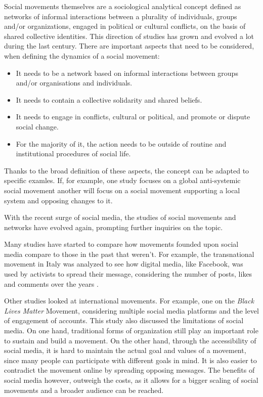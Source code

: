\documentclass{article}
\begin{document}
    Social movements themselves are a sociological analytical concept defined as networks of informal interactions between a plurality of individuals, groups and/or organizations, engaged in political or cultural conflicts, on the basis of shared collective identities. This direction of studies has grown and evolved a lot during the last century. There are important aspects that need to be considered, when defining the dynamics of a social movement: 
    \begin{itemize}
    \item It needs to be a network based on informal interactions between groups and/or organisations and individuals.
    \item It needs to contain a collective solidarity and shared beliefs.
    \item It needs to engage in conflicts, cultural or political, and promote or dispute social change.
    \item  For the majority of it, the action needs to be outside of routine and institutional procedures of social life.
    \end{itemize}
    Thanks to the broad definition of these aspects, the concept can be adapted to specific examles. If, for example, one study focuses on a global anti-systemic social movement another will focus on a social movement supporting a local system and opposing changes to it\cite{diani_concept_1992}.
    
    With the recent surge of social media, the studies of social movements and networks have evolved again, prompting further inquiries on the topic\cite{kumar_structure_2006}.
    
    Many studies have started to compare how movements founded upon social media compare to those in the past that weren't\cite{kidd_social_2016}. For example, the transnational movement in Italy was analyzed to see how digital media, like Facebook, was used by activists to spread their message, considering the number of posts, likes and comments over the  years \cite{pavan_digital_2019}. 
    
    Other studies looked at international movements. For example, one on the \textit{Black Lives Matter} Movement, considering multiple social media platforms and the level of engagement of accounts. This study also discussed the limitations of social media. On one hand, traditional forms of organization still play an important role to sustain and build a movement. On the other hand, through the accessibility of social media, it is hard to maintain the actual goal and values of a movement, since many people can participate with different goals in mind. It is also easier to contradict the movement online by spreading opposing messages. The benefits of social media however, outweigh the costs, as it allows for a bigger scaling of social movements and a broader audience can be reached. \cite{mundt_scaling_2018}
\end{document}
